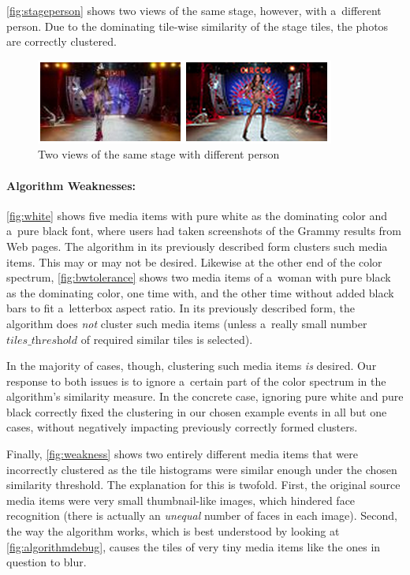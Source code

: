 \autoref{fig:stageperson} shows two views of the same stage,
however, with a~different person.
Due to the dominating tile-wise similarity of the stage tiles,
the photos are correctly clustered.

\begin{figure}[!ht]
  \centering
  \includegraphics[width=0.6\linewidth]{./stage.png}
  \caption{Two views of the same stage with different person}
  \label{fig:stageperson}
\end{figure}

\paragraph{Algorithm Weaknesses:}

\autoref{fig:white} shows five media items with pure white
as the dominating color and a~pure black font,
where users had taken screenshots of the Grammy results from Web pages.
The algorithm in its previously described form clusters such media items.
This may or may not be desired.
Likewise at the other end of the color spectrum,
\autoref{fig:bwtolerance} shows two media items of a~woman
with pure black as the dominating color,
one time with, and the other time without added black bars
to fit a~letterbox aspect ratio.
In its previously described form, the algorithm
does \emph{not} cluster such media items
(unless a~really small number $\textit{tiles\_threshold}$ 
of required similar tiles is selected).

In the majority of cases, though, clustering such media items \emph{is} desired.
Our response to both issues is to ignore a~certain part
of the color spectrum in the algorithm's similarity measure.
In the concrete case, ignoring pure white and pure black correctly fixed
the clustering in our chosen example events in all but one cases,
without negatively impacting previously correctly formed clusters.

Finally, \autoref{fig:weakness} shows two entirely different media items
that were incorrectly clustered as the tile histograms
were similar enough under the chosen similarity threshold.
The explanation for this is twofold.
First, the original source media items were very small thumbnail-like images,
which hindered face recognition
(there is actually an \emph{unequal} number of faces in each image).
Second, the way the algorithm works,
which is best understood by looking at \autoref{fig:algorithmdebug},
causes the tiles of very tiny media items like the ones in question to blur.


